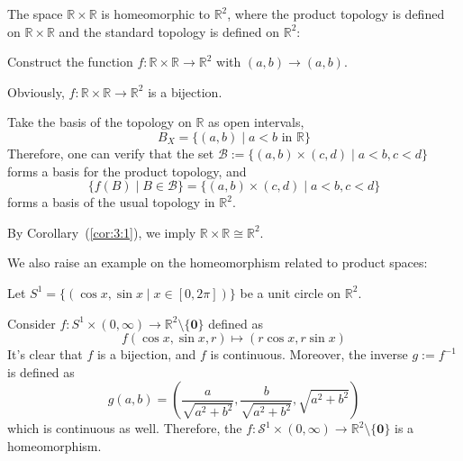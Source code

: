 \begin{example}
The space $\mathbb{R}\times\mathbb{R}$ is homeomorphic to $\mathbb{R}^2$, where the product topology is defined on $\mathbb{R}\times\mathbb{R}$ and the standard topology is defined on $\mathbb{R}^2$:

Construct the function $f:\mathbb{R}\times\mathbb{R}\to\mathbb{R}^2$ with $(a,b)\to(a,b)$.

Obviously, $f:\mathbb{R}\times\mathbb{R}\to\mathbb{R}^2$ is a bijection.

Take the basis of the topology on $\mathbb{R}$ as open intervals,
\[
B_X=\{(a,b)\mid a<b\text{ in $\mathbb{R}$}\}
\]
Therefore, one can verify that the set $\mathcal{B}:=\{(a,b)\times(c,d)\mid a<b,c<d\}$ forms a basis for the product topology, and 
\[
\{f(B)\mid B\in\mathcal{B}\}=\{(a,b)\times(c,d)\mid a<b,c<d\}
\]
forms a basis of the usual topology in $\mathbb{R}^2$.

By Corollary~(\ref{cor:3:1}), we imply $\mathbb{R}\times\mathbb{R}\cong\mathbb{R}^2$.
\end{example}
We also raise an example on the homeomorphism related to product spaces:
\begin{example}
Let $S^1=\{(\cos x,\sin x\mid x\in[0,2\pi])\}$ be a unit circle on $\mathbb{R}^2$.

Consider $f: S^1\times(0,\infty)\to\mathbb{R}^2\setminus\{\bm0\}$ defined as
\[
f(\cos x,\sin x,r)\mapsto(r\cos x,r\sin x)
\]
It's clear that $f$ is a bijection, and $f$ is continuous. 
Moreover, the inverse $g:=f^{-1}$ is defined as
\[
g(a,b)=(\frac{a}{\sqrt{a^2+b^2}},\frac{b}{\sqrt{a^2+b^2}},\sqrt{a^2+b^2})
\]
which is continuous as well.
Therefore, the $f:\mathcal{S}^1\times(0,\infty)\to\mathbb{R}^2\setminus\{\bm0\}$ is a homeomorphism.
\end{example}
















